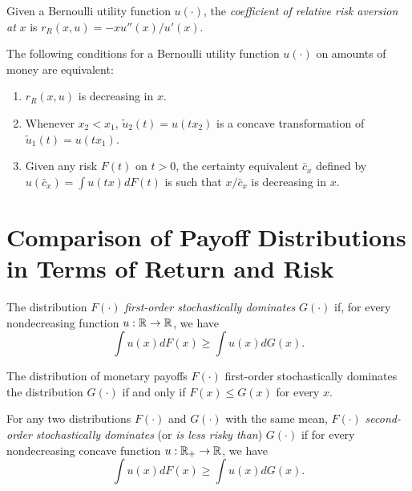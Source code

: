\begin{defn}
    Given a Bernoulli utility function $u(\cdot)$, the \emph{coefficient of relative risk aversion at} $x$ is $r_R(x, u) = -x u''(x) / u'(x)$.
\end{defn}

\begin{prop}
    The following conditions for a Bernoulli utility function $u(\cdot)$ on amounts of money are equivalent:
    \begin{enumerate}
        \item $r_R(x, u)$ is decreasing in $x$.
        \item Whenever $x_2 < x_1$, $\tilde{u}_2(t) = u(tx_2)$ is a concave transformation of $\tilde{u}_1(t) = u(tx_1)$.
        \item Given any risk $F(t)$ on $t > 0$, the certainty equivalent $\bar{c}_x$ defined by $u(\bar{c}_x) = \int u(tx) dF(t)$ is such that $x / \bar{c}_x$ is decreasing in $x$.
    \end{enumerate}
\end{prop}


\section{Comparison of Payoff Distributions in Terms of Return and Risk}

\begin{defn}
    The distribution $F(\cdot)$ \emph{first-order stochastically dominates} $G(\cdot)$ if, for every nondecreasing function $u : \mathbb{R} \to \mathbb{R}$, we have
    \begin{equation*}
        \int u(x) dF(x) \geq \int u(x) dG(x).
    \end{equation*}
\end{defn}

\begin{prop}
    The distribution of monetary payoffs $F(\cdot)$ first-order stochastically dominates the distribution $G(\cdot)$ if and only if $F(x) \leq G(x)$ for every $x$.
\end{prop}

\begin{defn}\label{pi.chvi.2-stoch-dom}
    For any two distributions $F(\cdot)$ and $G(\cdot)$ with the same mean, $F(\cdot)$ \emph{second-order stochastically dominates} (or \emph{is less risky than}) $G(\cdot)$ if for every nondecreasing concave function $u : \mathbb{R}_+ \to \mathbb{R}$, we have
    \begin{equation*}
        \int u(x) dF(x) \geq \int u(x) dG(x).
    \end{equation*}
\end{defn}

